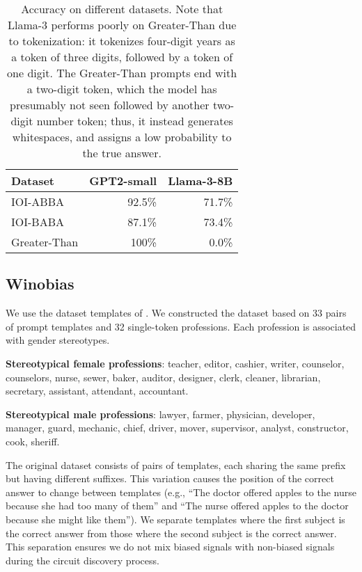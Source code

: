 \begin{table}[!ht]
\centering
\begin{tabular}{lrr}
 \toprule
 Dataset & GPT2-small & Llama-3-8B \\
 \midrule
 IOI-ABBA   & 92.5\%  & 71.7\% \\
 IOI-BABA   & 87.1\%  & 73.4\% \\
 Greater-Than & 100\% & 0.0\% \\
 \bottomrule
\end{tabular}
\caption{Accuracy on different datasets. Note that Llama-3 performs poorly on Greater-Than due to tokenization: it tokenizes four-digit years as a token of three digits, followed by a token of one digit. The Greater-Than prompts end with a two-digit token, which the model has presumably not seen followed by another two-digit number token; thus, it instead generates whitespaces, and assigns a low probability to the true answer.}
\label{tab:model_accuracy}
\end{table}


\subsection{Winobias}
\label{ap:task details:wb}

We use the dataset templates of \citet{zhao2018gender}. We constructed the dataset based on 33 pairs of prompt templates and 32 single-token professions. Each profession is associated with gender stereotypes.

\textbf{Stereotypical female professions}: teacher, editor, cashier, writer, counselor, counselors, nurse, sewer, baker, auditor, designer, clerk, cleaner, librarian, secretary, assistant, attendant, accountant.

\textbf{Stereotypical male professions}: lawyer, farmer, physician, developer, manager, guard, mechanic, chief, driver, mover, supervisor, analyst, constructor, cook, sheriff.

The original dataset consists of pairs of templates, each sharing the same prefix but having different suffixes. This variation causes the position of the correct answer to change between templates (e.g., ``The doctor offered apples to the nurse because she had too many of them'' and ``The nurse offered apples to the doctor because she might like them''). We separate templates where the first subject is the correct answer from those where the second subject is the correct answer. This separation ensures we do not mix biased signals with non-biased signals during the circuit discovery process.

